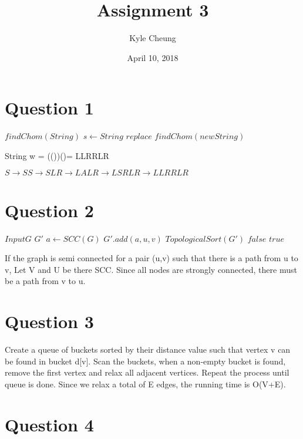 \documentclass[10pt]{article}
\title{Assignment 3}
\date{April 10, 2018}
\author{Kyle Cheung}
\begin{document}
\maketitle
{}
\newpage
{}

\section*{Question 1}

\begin{algorithmic}
\State $findChom(String)$
\State $s\gets String$
\State $replace$
\State $findChom(newString)$
\EndIf
\EndFor
\end{algorithmic}

String w = (())()= LLRRLR

$S \rightarrow SS\rightarrow SLR\rightarrow LALR\rightarrow LSRLR \rightarrow LLRRLR$


\section*{Question 2}

\begin{algorithmic}
\State $Input G$
\State $G'$
\State $a\gets SCC(G)$
\State $G'.add(a,{u,v})$
\EndWhile
\State $Topological Sort(G')$
\State $false$
\EndIf
\EndFor
\State $true$
\end{algorithmic}

If the graph is semi connected for a pair (u,v) such that there is a path from u to v, Let V and U be there SCC. Since all nodes are strongly connected, there must be a path from v to u.

\section*{Question 3}

Create a queue of buckets sorted by their distance value such that vertex v can be found in bucket d[v]. Scan the buckets, when a non-empty bucket is found, remove the first vertex and relax all adjacent vertices. Repeat the process until queue is done. Since we relax a total of E edges, the running time is O(V+E).

\section*{Question 4}
\end{document}
